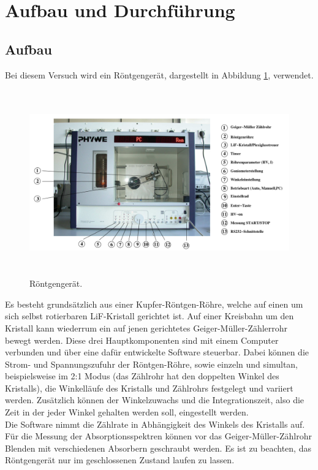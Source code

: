 \section{Aufbau und Durchführung}
\subsection{Aufbau}
\label{sec:Aufbau}

Bei diesem Versuch wird ein Röntgengerät, dargestellt in Abbildung \ref{abb:1}, verwendet.
\begin{figure}[H]
  \centering
  \includegraphics[height=8cm]{ressources/aufbau.png}
  \caption{Röntgengerät. \cite{skript}}
  \label{abb:1}
\end{figure}
Es besteht grundsätzlich aus einer Kupfer-Röntgen-Röhre, welche auf einen um sich selbst rotierbaren LiF-Kristall gerichtet ist.
Auf einer Kreisbahn um den Kristall kann wiederrum ein auf jenen gerichtetes Geiger-Müller-Zählerrohr bewegt werden.
Diese drei Hauptkomponenten sind mit einem Computer verbunden und über eine dafür entwickelte Software steuerbar.
Dabei können die Strom- und Spannungszufuhr der Röntgen-Röhre, sowie einzeln und simultan, beispielsweise im 2:1 Modus (das Zählrohr hat den doppelten Winkel des Kristalls), die Winkelläufe des Kristalls und Zählrohrs festgelegt und variiert werden.
Zusätzlich können der Winkelzuwachs und die Integrationszeit, also die Zeit in der jeder Winkel gehalten werden soll, eingestellt werden.\\
Die Software nimmt die Zählrate in Abhängigkeit des Winkels des Kristalls auf.
Für die Messung der Absorptionsspektren können vor das Geiger-Müller-Zählrohr Blenden mit verschiedenen Absorbern geschraubt werden.
Es ist zu beachten, das Röntgengerät nur im geschlossenen Zustand laufen zu lassen.

